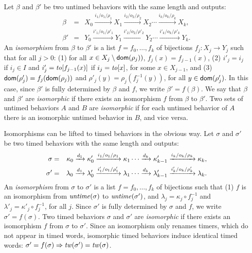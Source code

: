 Let $\beta$ and $\beta'$ be two untimed behaviors with the same length and outputs:
\begin{eqnarray*}
\beta & = & X_0 \xrightarrow{i_1/o_1/\rho_1} X_1  \xrightarrow{i_2/o_2/\rho_2} X_2 \cdots \xrightarrow{i_k/o_k/\rho_k} X_{k},\\
\beta' & = & Y_0 \xrightarrow{i'_1/o_1/\rho'_1} Y_1  \xrightarrow{i'_2/o_2/\rho'_2} Y_2 \cdots \xrightarrow{i'_k/o_k/\rho'_k} Y_{k}.
\end{eqnarray*}
An \emph{isomorphism} from $\beta$ to $\beta'$ is a list $f = f_0 ,\ldots, f_k$ of bijections $f_j : X_j \rightarrow Y_j$ such that
for all $j>0$: (1) for all $x \in X_j \setminus {\textsf{dom}}(\rho_j))$, $f_j(x)=f_{j-1}(x)$,
(2) $i'_j = i_j$ if $i_j \in I$ and $i'_j = \mathit{to}[f_{j-1}(x)]$ if $i_j = \mathit{to}[x]$, for some $x \in X_{j-1}$, and
(3) ${\textsf{dom}}(\rho'_j) = f_j({\textsf{dom}}(\rho_j))$ and $\rho'_j(y) = \rho_j ( f_j^{-1}(y))$, for all $y\in{\textsf{dom}}(\rho'_j)$.
In this case, since $\beta'$ is fully determined by $\beta$ and $f$, we write $\beta' = f(\beta)$.
We say that $\beta$ and $\beta'$ are \emph{isomorphic} if there exists an isomorphism $f$ from $\beta$ to $\beta'$.
Two sets of untimed behaviors $A$ and $B$ are \emph{isomorphic} if for each untimed behavior of $A$ there is an isomorphic untimed behavior in $B$,
and vice versa.

Isomorphisms can be lifted to timed behaviors in the obvious way. 
Let $\sigma$ and $\sigma'$ be two timed behaviors with the same length and outputs:
\begin{eqnarray*}
\sigma & = & \kappa_0 \xrightarrow{d_1} \kappa'_0 \xrightarrow{i_1/o_1/\rho_1} \kappa_1  \cdots
\xrightarrow{d_k} \kappa'_{k-1} \xrightarrow{i_k/o_k/\rho_k} \kappa_{k},\\
\sigma' & = & \lambda_0 \xrightarrow{d_1} \lambda'_0 \xrightarrow{i'_1/o_1/\rho'_1} \lambda_1  \cdots
\xrightarrow{d_k} \lambda'_{k-1} \xrightarrow{i'_k/o_k/\rho'_k} \lambda_{k}.
\end{eqnarray*}
An \emph{isomorphism} from $\sigma$ to $\sigma'$ is a list $f = f_0 ,\ldots, f_k$ of bijections such that
(1) $f$ is an isomorphism from $\mathit{untime}(\sigma)$ to $\mathit{untime}(\sigma')$, and
$\lambda_j = \kappa_j \circ f_j^{-1}$ and $\lambda'_j = \kappa'_j \circ f_j^{-1}$, for all $j$.
Since $\sigma'$ is fully determined by $\sigma$ and $f$, we write $\sigma' = f(\sigma)$.
Two timed behaviors $\sigma$ and $\sigma'$ are \emph{isomorphic} if there exists an isomorphism $f$ from $\sigma$ to $\sigma'$.
Since an isomorphism only renames timers, which do not appear in timed words, 
isomorphic timed behaviors induce identical timed words: $\sigma' = f(\sigma) \Rightarrow \mathit{tw}(\sigma') = \mathit{tw}(\sigma)$.

